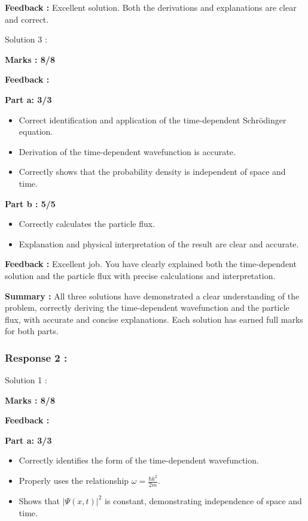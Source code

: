\documentclass[a4paper,11pt]{article}
\begin{document}
\textbf{Feedback :}
Excellent solution. Both the derivations and explanations are clear and correct.


Solution 3 :

\textbf{Marks : 8/8}

\textbf{Feedback :}

\textbf{Part a: 3/3}

\begin{itemize}
    \item Correct identification and application of the time-dependent Schrödinger equation.
    \item Derivation of the time-dependent wavefunction is accurate.
    \item Correctly shows that the probability density is independent of space and time.
\end{itemize}

\textbf{Part b : 5/5}

\begin{itemize}
    \item Correctly calculates the particle flux.
    \item Explanation and physical interpretation of the result are clear and accurate.
\end{itemize}

\textbf{Feedback :}
Excellent job. You have clearly explained both the time-dependent solution and the particle flux with precise calculations and interpretation.

\textbf{Summary :}
All three solutions have demonstrated a clear understanding of the problem, correctly deriving the time-dependent wavefunction and the particle flux, with accurate and concise explanations. Each solution has earned full marks for both parts.



\subsubsection*{Response 2 :}

Solution 1 :

\textbf{Marks : 8/8}

\textbf{Feedback :}

\textbf{Part a: 3/3}
\begin{itemize}
    \item Correctly identifies the form of the time-dependent wavefunction.
    \item Properly uses the relationship $\omega = \frac{\hbar k^2}{2m}$.
    \item Shows that $|\Psi (x,t)|^2$ is constant, demonstrating independence of space and time.
\end{itemize}
\end{document}
